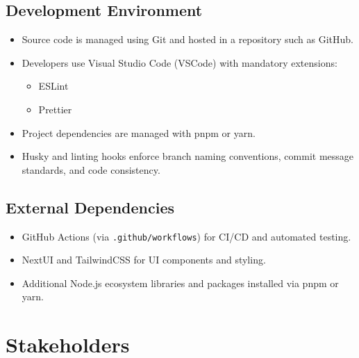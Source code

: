 \documentclass[12pt]{article}
\begin{document}
    \subsection{Development Environment}
    \begin{itemize}
        \item Source code is managed using Git and hosted in a repository such as GitHub.
        \item Developers use Visual Studio Code (VSCode) with mandatory extensions:
        \begin{itemize}
            \item ESLint
            \item Prettier
        \end{itemize}
        \item Project dependencies are managed with pnpm or yarn.
        \item Husky and linting hooks enforce branch naming conventions, commit message standards, and code consistency.
    \end{itemize}

    \subsection{External Dependencies}
    \begin{itemize}
        \item GitHub Actions (via \texttt{.github/workflows}) for CI/CD and automated testing.
        \item NextUI and TailwindCSS for UI components and styling.
        \item Additional Node.js ecosystem libraries and packages installed via pnpm or yarn.
    \end{itemize}


\section{Stakeholders}
\end{document}
